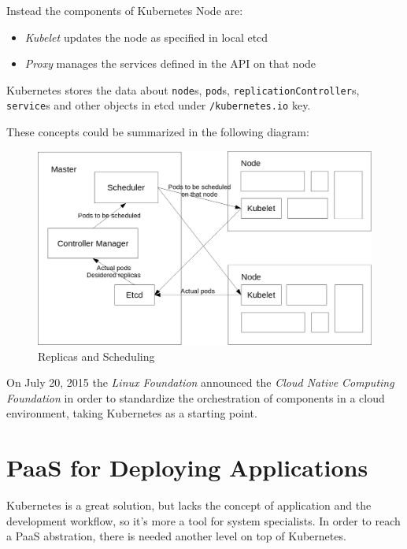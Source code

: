 Instead the components of Kubernetes Node are:

\begin{itemize}
\itemsep1pt\parskip0pt
\item
  \emph{Kubelet} updates the node as specified in local etcd
\item
  \emph{Proxy} manages the services defined in the API on that node
\end{itemize}

Kubernetes stores the data about \texttt{node}s, \texttt{pod}s,
\texttt{replicationController}s, \texttt{service}s and other objects in
etcd under \texttt{/kubernetes.io} key.

These concepts could be summarized in the following diagram:

\begin{figure}[htbp]
\centering
\includegraphics{media/ch5-scheduling.png}
\caption{Replicas and Scheduling}
\end{figure}

On July 20, 2015 the \emph{Linux Foundation} announced the \emph{Cloud
Native Computing Foundation}\cite{CloudNativeComputingFoundation} in
order to standardize the orchestration of components in a cloud
environment, taking Kubernetes as a starting point.

\section{PaaS for Deploying
Applications}\label{paas-for-deploying-applications}

Kubernetes is a great solution, but lacks the concept of application and
the development workflow, so it's more a tool for system specialists. In
order to reach a PaaS abstration, there is needed another level on top
of Kubernetes.

